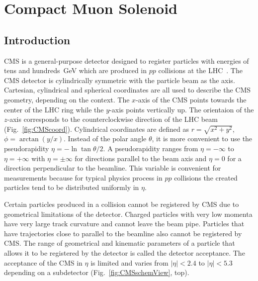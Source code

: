 \section{Compact Muon Solenoid}
\label{sec:Exp_CMS}
\subsection{Introduction}



CMS is a general-purpose detector designed to register particles with energies of tens and hundreds~GeV which are produced in $pp$ collisions at the LHC~\cite{ref_CMS_TDR}. The CMS detector is cylindrically symmetric with the particle beam as the axis. Cartesian, cylindrical and spherical coordinates are all used to describe the CMS geometry, depending on the context. The $x$-axis of the CMS points towards the center of the LHC ring while the $y$-axis points vertically up. The orientaion of the $z$-axis corresponds to the counterclockwise direction of the LHC beam (Fig.~\ref{fig:CMScoord}). Cylindrical coordinates are defined as $r=\sqrt{x^2+y^2}$, $\phi=\arctan(y/x)$. Instead of the polar angle $\theta$, it is more convenient to use the pseudorapidity $\eta=-\ln{\tan{\theta/2}}$. A pseudorapidity ranges from $\eta=-\infty$ to $\eta=+\infty$ with $\eta=\pm \infty$ for directions parallel to the beam axis and $\eta=0$ for a direction perpendicular to the beamline. This variable is convenient for measurements because for typical physics process in $pp$ collisions the created particles tend to be distributed uniformly in $\eta$. 

Certain particles produced in a collision cannot be registered by CMS due to geometrical limitations of the detector. Charged particles with very low momenta have very large track curvature and cannot leave the beam pipe. Particles that have trajectories close to parallel to the beamline also cannot be registered by CMS. The range of geometrical and kinematic parameters of a particle that allows it to be registered by the detector is called the detector acceptance. The acceptance of the CMS in $\eta$ is limited and varies from $|\eta|<2.4$ to $|\eta|<5.3$ depending on a subdetector (Fig.~\ref{fig:CMSschemView}, top).   

